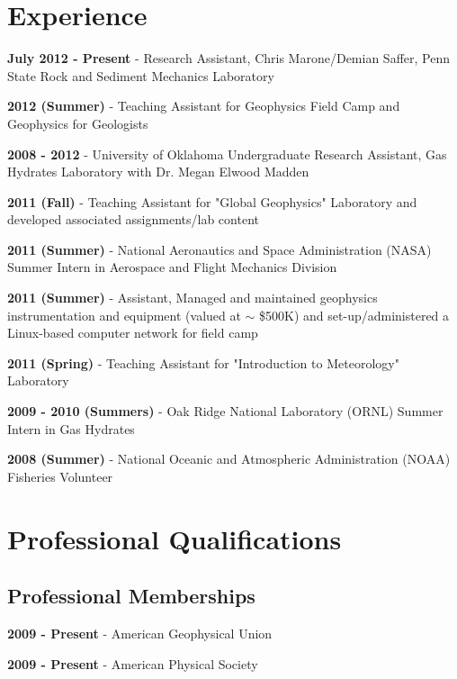 \documentclass[letterpaper]{article}
\renewenvironment{itemize}{
  \begin{list}{}{
    \setlength{\leftmargin}{1.5em}
  }
}{
  \end{list}
}
\begin{document}
\section*{Experience}

\begin{itemize}
\item \textbf{July 2012 - Present} - Research Assistant, Chris Marone/Demian Saffer, Penn State Rock and Sediment Mechanics Laboratory
\item \textbf{2012 (Summer)} - Teaching Assistant for Geophysics Field Camp and Geophysics for Geologists
\item \textbf{2008 - 2012} - University of Oklahoma Undergraduate Research Assistant, Gas Hydrates Laboratory with Dr. Megan Elwood Madden
\item \textbf{2011 (Fall)} - Teaching Assistant for "Global Geophysics" Laboratory and developed associated assignments/lab content
\item \textbf{2011 (Summer)} - National Aeronautics and Space Administration (NASA) Summer Intern in Aerospace and Flight Mechanics Division
\item \textbf{2011 (Summer)} - Assistant, Managed and maintained geophysics instrumentation and equipment (valued at $\sim$ \$500K) and set-up/administered a Linux-based computer network for field camp
\item \textbf{2011 (Spring)} - Teaching Assistant for "Introduction to Meteorology" Laboratory
\item \textbf{2009 - 2010 (Summers)} - Oak Ridge National Laboratory (ORNL) Summer Intern in Gas Hydrates
\item \textbf{2008 (Summer)} - National Oceanic and Atmospheric Administration (NOAA) Fisheries Volunteer
\end{itemize}

\section*{Professional Qualifications}

\subsection*{Professional Memberships}
\begin{itemize}
\item \textbf{2009 - Present} - American Geophysical Union 
\item \textbf{2009 - Present} - American Physical Society      
\end{itemize}
\end{document}
